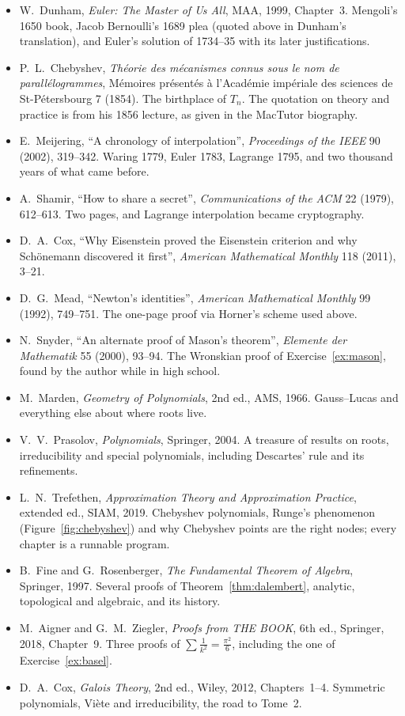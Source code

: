 \begin{itemize}\raggedright
\item W.~Dunham, \emph{Euler: The Master of Us All}, MAA, 1999, Chapter~3. Mengoli's 1650 book, Jacob Bernoulli's 1689 plea (quoted above in Dunham's translation), and Euler's solution of 1734--35 with its later justifications.
\item P.~L.~Chebyshev, \emph{Th\'eorie des m\'ecanismes connus sous le nom de parall\'elogrammes}, M\'emoires pr\'esent\'es \`a l'Acad\'emie imp\'eriale des sciences de St-P\'etersbourg 7 (1854). The birthplace of $T_n$. The quotation on theory and practice is from his 1856 lecture, as given in the MacTutor biography.
\item E.~Meijering, ``A chronology of interpolation'', \emph{Proceedings of the IEEE} 90 (2002), 319--342. Waring 1779, Euler 1783, Lagrange 1795, and two thousand years of what came before.
\item A.~Shamir, ``How to share a secret'', \emph{Communications of the ACM} 22 (1979), 612--613. Two pages, and Lagrange interpolation became cryptography.
\item D.~A.~Cox, ``Why Eisenstein proved the Eisenstein criterion and why Sch\"onemann discovered it first'', \emph{American Mathematical Monthly} 118 (2011), 3--21.
\item D.~G.~Mead, ``Newton's identities'', \emph{American Mathematical Monthly} 99 (1992), 749--751. The one-page proof via Horner's scheme used above.
\item N.~Snyder, ``An alternate proof of Mason's theorem'', \emph{Elemente der Mathematik} 55 (2000), 93--94. The Wronskian proof of Exercise~\ref{ex:mason}, found by the author while in high school.
\item M.~Marden, \emph{Geometry of Polynomials}, 2nd ed., AMS, 1966. Gauss--Lucas and everything else about where roots live.
\item V.~V.~Prasolov, \emph{Polynomials}, Springer, 2004. A treasure of results on roots, irreducibility and special polynomials, including Descartes' rule and its refinements.
\item L.~N.~Trefethen, \emph{Approximation Theory and Approximation Practice}, extended ed., SIAM, 2019. Chebyshev polynomials, Runge's phenomenon (Figure~\ref{fig:chebyshev}) and why Chebyshev points are the right nodes; every chapter is a runnable program.
\item B.~Fine and G.~Rosenberger, \emph{The Fundamental Theorem of Algebra}, Springer, 1997. Several proofs of Theorem~\ref{thm:dalembert}, analytic, topological and algebraic, and its history.
\item M.~Aigner and G.~M.~Ziegler, \emph{Proofs from THE BOOK}, 6th ed., Springer, 2018, Chapter~9. Three proofs of $\sum\frac1{k^2}=\frac{\pi^2}6$, including the one of Exercise~\ref{ex:basel}.
\item D.~A.~Cox, \emph{Galois Theory}, 2nd ed., Wiley, 2012, Chapters~1--4. Symmetric polynomials, Vi\`ete and irreducibility, the road to Tome~2.
\end{itemize}
